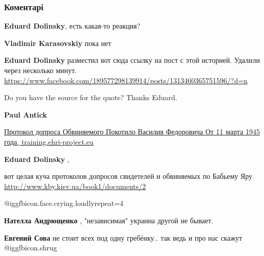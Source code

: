  
 
 
 
 
\subsubsection{Коментарі}

\begin{itemize} %
\textbf{Eduard Dolinsky}, есть какая-то реакция?

\begin{itemize} %
\textbf{Vladimir Karasovskiy} пока нет

\textbf{Eduard Dolinsky} разместил вот сюда ссылку на пост с этой историей. Удалили через несколько минут.
\url{https://www.facebook.com/189577298139914/posts/1313460365751596/?d=n}
\end{itemize} %

Do you have the source for the quote? Thanks Eduard.

\begin{itemize} %
\textbf{Paul Antick}

\href{https://training.ehri-project.eu/sites/training.ehri-project.eu/files/Transcription%20Former%20Policeman%20Vasyl%20Pokotylo%20is%20Questioned%20by%20Soviet%20Interrogators.pdf}{%
Протокол допроса Обвиняемого Покотило Василия Федоровича От 11 марта 1945 года, training.ehri-project.eu%
}

\textbf{Eduard Dolinsky} , 

вот целая куча протоколов допросов свидетелей и обвиняемых по Бабьему Яру
\url{http://www.kby.kiev.ua/book1/documents/2}

\end{itemize} %

 @igg{fbicon.face.crying.loudly}{repeat=4} 

\begin{itemize} %
\textbf{Нателла Андрющенко} , "независимая" украина другой не бывает.

\textbf{Евгений Сова} не стоит всех под одну гребёнку.. так ведь и про нас скажут  @igg{fbicon.shrug} 


\end{itemize}
\end{itemize}
